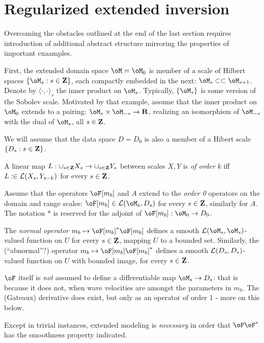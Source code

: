 \section{Regularized extended inversion}
Overcoming the obstacles outlined at the end of the last section
requires introduction of additional abstract structure mirroring the
properties of important exaamples.

First, the extended domain space $\oM=\oM_0$ is member of a scale of Hilbert
spaces $\{\oM_s: s \in \bf{Z}\}$, each compactly embedded in the next: $\oM_s \subset \subset \oM_{s+1}$. Denote by $\langle \cdot ,\cdot \rangle_{s}$ the inner product
on $\oM_s$. Typically, $\{\oM_s\}$ is some version of the Sobolev
scale. Motivated by that example, assume that the inner product on
$\oM_0$ extends to a pairing: $\oM_s \times \oM_{-s} \rightarrow
\bf{R}$, realizing an isomorphism of $\oM_{-s}$ with the dual of
$\oM_s$, all $s \in \bf{Z}$.

We will assume that the data space $D = D_0$ is also a member of a
Hibert scale $\{D_s: s \in \bf{Z}\}$.

A linear map $L: \cup_{s \in \bf{Z}} X_s \rightarrow \cup_{s \in
  \bf{Z}}Y_s$ between scales $X, Y$ is {\em of order} $k$ iff $L: \in
{\cal L}(X_s,Y_{s-k})$ for every $s \in \bf{Z}$.

 Assume that the operators $\oF[m_b]$ and $A$ extend to
the  {\em order 0} operators on the domain and range scales: $\oF[m_b]
\in {\cal L}(\oM_s,D_s)$ for every $s \in \bf{Z}$, similarly for $A$. The
notation $*$ is reserved for the adjoint of
$\oF[m_b]: \oM_0 \rightarrow D_0$. 

  The {\em normal operator} $ m_b
\mapsto \oF[m_b]^*\oF[m_b]$ defines a smooth
${\cal L}(\oM_s,\oM_s)$-valued function on $U$ for every $s\in
\bf{Z}$, mapping $U$ to a bounded set. Similarly, the (``abnormal''?) operator $ m_b
\mapsto \oF[m_b]\oF[m_b]^*$ defines a smooth
${\cal L}(D_s,D_s)$-valued function on $U$ with bounded image, for every  $s \in \bf{Z}$.

 $\oF$ itself is {\em not} assumed to define a differentiable
map $\oM_s \rightarrow D_s$: that is because it does not, when wave
velocities are amongst the parameters in $m_b$. The (Gateaux) derivative does
exist, but only as an operator of order 1 - more on this below.

 Except in trivial instances, extended
modeling is {\em necessary} in order that $\oF\oF^*$ has the
smoothness property indicated.

